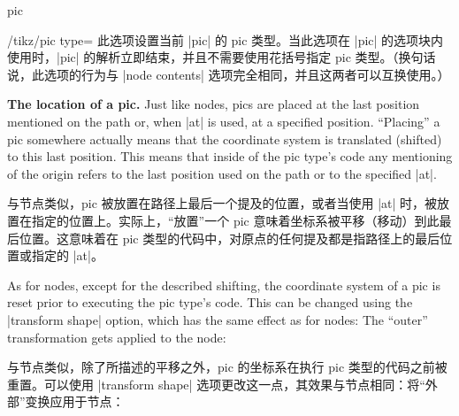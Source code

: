 \begin{pathoperation}{pic}
\begin{key}{/tikz/pic type=}
        此选项设置当前 |pic| 的 pic 类型。当此选项在 |pic| 的选项块内使用时，|pic| 的解析立即结束，并且不需要使用花括号指定 pic 类型。（换句话说，此选项的行为与 |node contents| 选项完全相同，并且这两者可以互换使用。）
\begin{codeexample}[
    pre={\tikzset{
  seagull/.pic={
    \draw (-3mm,0) to [bend left] (0,0) to [bend left] (3mm,0);
  },
}}]
\end{codeexample}
    \end{key}

    \medskip
    \textbf{The location of a pic.}
    Just like nodes, pics are placed at the last position mentioned on the path
    or, when |at| is used, at a specified position. ``Placing'' a pic somewhere
    actually means that the coordinate system is translated (shifted) to this
    last position. This means that inside of the pic type's code any mentioning
    of the origin refers to the last position used on the path or to the
    specified |at|.
    
    与节点类似，pic 被放置在路径上最后一个提及的位置，或者当使用 |at| 时，被放置在指定的位置上。实际上，“放置”一个 pic 意味着坐标系被平移（移动）到此最后位置。这意味着在 pic 类型的代码中，对原点的任何提及都是指路径上的最后位置或指定的 |at|。
\begin{codeexample}[
    pre={\tikzset{
  seagull/.pic={
    \draw (-3mm,0) to [bend left] (0,0) to [bend left] (3mm,0);
  },
}}]
\end{codeexample}

    As for nodes, except for the described shifting, the coordinate system of a
    pic is reset prior to executing the pic type's code. This can be changed
    using the |transform shape| option, which has the same effect as for nodes:
    The ``outer'' transformation gets applied to the node:
    
    与节点类似，除了所描述的平移之外，pic 的坐标系在执行 pic 类型的代码之前被重置。可以使用 |transform shape| 选项更改这一点，其效果与节点相同：将“外部”变换应用于节点：
\begin{codeexample}[
    pre={\tikzset{
  seagull/.pic={
    \draw (-3mm,0) to [bend left] (0,0) to [bend left] (3mm,0);
  },
}}]
\end{codeexample}


\end{pathoperation}
